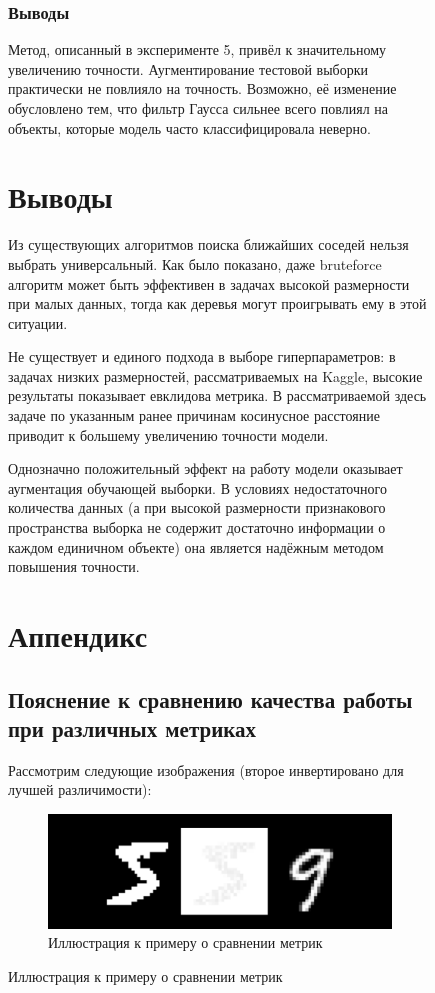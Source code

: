 \documentclass{article}
\begin{document}
\begin{figure}[H]
        \subsubsection{Выводы}
            Метод, описанный в эксперименте 5, привёл к значительному увеличению точности.
            Аугментирование тестовой выборки практически не повлияло на точность.
            Возможно, её изменение обусловлено тем, что фильтр Гаусса сильнее всего повлиял на объекты, которые модель часто классифицировала неверно.

\section{Выводы}
            Из существующих алгоритмов поиска ближайших соседей нельзя выбрать универсальный.
            Как было показано, даже bruteforce алгоритм может быть эффективен в задачах высокой размерности при малых данных,
            тогда как деревья могут проигрывать ему в этой ситуации.

            Не существует и единого подхода в выборе гиперпараметров: в задачах низких размерностей, рассматриваемых на Kaggle,
            высокие результаты показывает евклидова метрика. В рассматриваемой здесь задаче по указанным ранее причинам
            косинусное расстояние приводит к большему увеличению точности модели.

            Однозначно положительный эффект на работу модели оказывает аугментация обучающей выборки.
            В условиях недостаточного количества данных (а при высокой размерности признакового пространства выборка не содержит достаточно информации о каждом единичном объекте) она является надёжным методом повышения точности.

\section{Аппендикс}
    \subsection{Пояснение к сравнению качества работы при различных метриках}
    Рассмотрим следующие изображения (второе инвертировано для лучшей различимости):

        \begin{figure}[H]
        \centering
        \includegraphics[width=0.8\linewidth]{./pictures/EuclideanVSCosine.pdf}
        \caption{Иллюстрация к примеру о сравнении метрик}
        \label{fig:mpr}
        \end{figure}


\end{figure}
\end{document}
